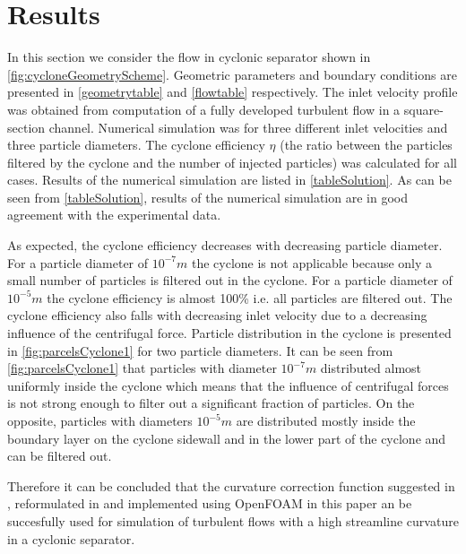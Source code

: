 \documentclass[a4paper]{jpconf}
\begin{document}
\section{Results}

In this section we consider the flow in cyclonic separator shown in \cref{fig:cycloneGeometryScheme}. Geometric parameters and boundary conditions are presented in \cref{geometrytable} and \cref{flowtable} respectively. The inlet velocity profile was obtained from computation of a fully developed turbulent flow in a square-section channel. Numerical simulation was for three different inlet velocities and three particle diameters. The cyclone efficiency $\eta$ (the ratio between the particles filtered by the cyclone and the number of injected particles) was calculated for all cases. Results of the numerical simulation are listed in \cref{tableSolution}. As can be seen from \cref{tableSolution}, results of the numerical simulation are in good agreement with the experimental data.

As expected, the cyclone efficiency decreases with decreasing particle diameter. For a particle diameter of $10^{-7}m$ the cyclone is not applicable because only a small number of particles is filtered out in the cyclone. For a particle diameter of $10^{-5}m$ the cyclone efficiency is almost 100\% i.e. all particles are filtered out. The cyclone efficiency also falls with decreasing inlet velocity due to a decreasing influence of the centrifugal force. Particle distribution in the cyclone is presented in \cref{fig:parcelsCyclone1} for two particle diameters. It can be seen from \cref{fig:parcelsCyclone1} that particles with diameter $10^{-7}m$ distributed almost uniformly inside the cyclone which means that the influence of centrifugal forces is not strong enough to filter out a significant fraction of particles. On the opposite, particles with diameters $10^{-5}m$ are distributed mostly inside the boundary layer on the cyclone sidewall and in the lower part of the cyclone and can be filtered out.

Therefore it can be concluded that the curvature correction function suggested in \cite{ShurSpallart}, reformulated in \cite{Smirnov} and implemented using OpenFOAM{\textregistered} in this paper an be succesfully used for simulation of turbulent flows with a high streamline curvature in a cyclonic separator.
\end{document}
